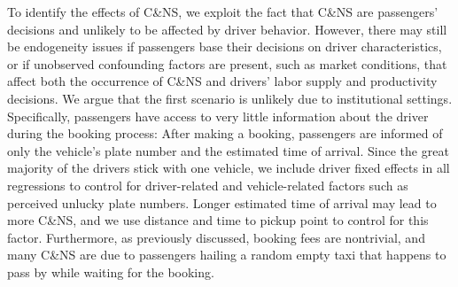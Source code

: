 \documentclass[reviewmode]{restud}
\begin{document}
To identify the effects of C\&NS, we exploit the fact that C\&NS are passengers' decisions and unlikely to be affected by driver behavior. However, there may still be endogeneity issues if passengers base their decisions on driver characteristics, or if unobserved confounding factors are present, such as market conditions, that affect both the occurrence of C\&NS and drivers' labor supply and productivity decisions. We argue that the first scenario is unlikely due to institutional settings. Specifically, passengers have access to very little information about the driver during the booking process: After making a booking, passengers are informed of only the vehicle's plate number and the estimated time of arrival. Since the great majority of the drivers stick with one vehicle, we include driver fixed effects in all regressions to control for driver-related and vehicle-related factors such as perceived unlucky plate numbers. Longer estimated time of arrival may lead to more C\&NS, and we use distance and time to pickup point to control for this factor. 
Furthermore, as previously discussed, booking fees are nontrivial, and many C\&NS are due to passengers hailing a random empty taxi that happens to pass by while waiting for the booking. 
\end{document}
